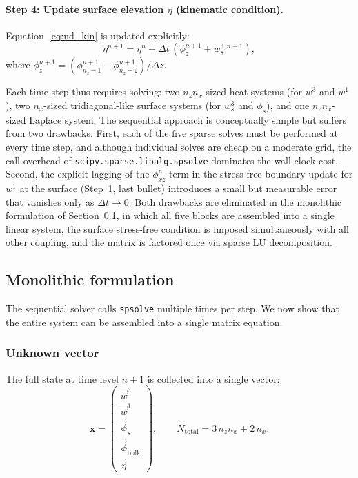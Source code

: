 \documentclass{article}
\newcommand{\xx}{\mathbf{x}}
\begin{document}
\paragraph{Step 4: Update surface elevation $\eta$ (kinematic condition).}
Equation~\eqref{eq:nd_kin} is updated explicitly:
\begin{equation}
    \eta^{n+1} = \eta^n + \Delta t\,\left(\phi_z^{n+1} + w^{3,n+1}_s\right), \label{eq:eta_disc}
\end{equation}
where $\phi_z^{n+1} = (\phi^{n+1}_{n_z-1} - \phi^{n+1}_{n_z-2})/\Delta z$.

Each time step thus requires solving: two $n_z n_x$-sized heat systems (for $w^3$ and $w^1$), two $n_x$-sized tridiagonal-like surface systems (for $w^3_s$ and $\phi_s$), and one $n_z n_x$-sized Laplace system.
\color{blue}
The sequential approach is conceptually simple but suffers from two drawbacks.
First, each of the five sparse solves must be performed at every time step, and although individual solves are cheap on a moderate grid, the call overhead of \texttt{scipy.sparse.linalg.spsolve} dominates the wall-clock cost.
Second, the explicit lagging of the $\phi^n_{xz}$ term in the stress-free boundary update for $w^1$ at the surface (Step~1, last bullet) introduces a small but measurable error that vanishes only as $\Delta t \to 0$.
Both drawbacks are eliminated in the monolithic formulation of Section~\ref{sec:monolithic}, in which all five blocks are assembled into a single linear system, the surface stress-free condition is imposed simultaneously with all other coupling, and the matrix is factored once via sparse LU decomposition.
\color{black}

\subsection{Monolithic formulation}
\label{sec:monolithic}

The sequential solver calls \texttt{spsolve} multiple times per step.
We now show that the entire system can be assembled into a single matrix equation.

\subsubsection{Unknown vector}

The full state at time level $n+1$ is collected into a single vector:
\begin{equation}
    \xx = \begin{pmatrix} \vec{w}^3 \\ \vec{w}^1 \\ \vec{\phi}_s \\ \vec{\phi}_{\mathrm{bulk}} \\ \vec{\eta} \end{pmatrix}, \qquad N_{\mathrm{total}} = 3\,n_z n_x + 2\,n_x.
    \label{eq:state_vector}
\end{equation}
\end{document}
